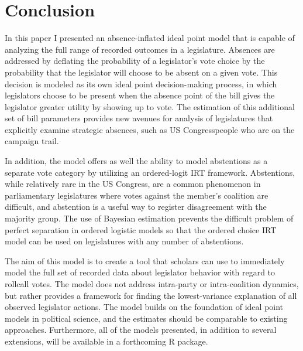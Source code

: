 	\section{Conclusion}
	
	In this paper I presented an absence-inflated ideal point model that is capable of analyzing the full range of recorded outcomes in a legislature. Absences are addressed by deflating the probability of a legislator's vote choice by the probability that the legislator will choose to be absent on a given vote. This decision is modeled as its own ideal point decision-making process, in which legislators choose to be present when the absence point of the bill gives the legislator greater utility by showing up to vote. The estimation of this additional set of bill parameters provides new avenues for analysis of legislatures that explicitly examine strategic absences, such as US Congresspeople who are on the campaign trail.
	
	In addition, the model offers as well the ability to model abstentions as a separate vote category by utilizing an ordered-logit IRT framework. Abstentions, while relatively rare in the US Congress, are a common phenomenon in parliamentary legislatures where votes against the member's coalition are difficult, and abstention is a useful way to register disagreement with the majority group. The use of Bayesian estimation prevents the difficult problem of perfect separation in ordered logistic models so that the ordered choice IRT model can be used on legislatures with any number of abstentions.
	
	The aim of this model is to create a tool that scholars can use to immediately model the full set of recorded data about legislator behavior with regard to rollcall votes. The model does not address intra-party or intra-coalition dynamics, but rather provides a framework for finding the lowest-variance explanation of all observed legislator actions. The model builds on the foundation of ideal point models in political science, and the estimates should be comparable to existing approaches. Furthermore, all of the models presented, in addition to several extensions, will be available in a forthcoming R package.
	
	\printbibliography
	
